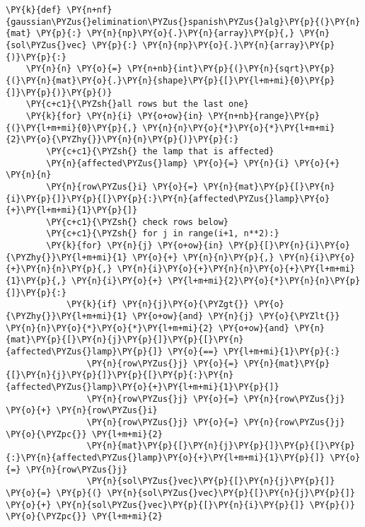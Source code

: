 \begin{english}
    \begin{tcolorbox}[breakable, size=fbox, boxrule=1pt, pad at break*=1mm,colback=cellbackground, colframe=cellborder]
\begin{Verbatim}[commandchars=\\\{\}]
\PY{k}{def} \PY{n+nf}{gaussian\PYZus{}elimination\PYZus{}spanish\PYZus{}alg}\PY{p}{(}\PY{n}{mat} \PY{p}{:} \PY{n}{np}\PY{o}{.}\PY{n}{array}\PY{p}{,} \PY{n}{sol\PYZus{}vec} \PY{p}{:} \PY{n}{np}\PY{o}{.}\PY{n}{array}\PY{p}{)}\PY{p}{:}
    \PY{n}{n} \PY{o}{=} \PY{n+nb}{int}\PY{p}{(}\PY{n}{sqrt}\PY{p}{(}\PY{n}{mat}\PY{o}{.}\PY{n}{shape}\PY{p}{[}\PY{l+m+mi}{0}\PY{p}{]}\PY{p}{)}\PY{p}{)}
    \PY{c+c1}{\PYZsh{}all rows but the last one}
    \PY{k}{for} \PY{n}{i} \PY{o+ow}{in} \PY{n+nb}{range}\PY{p}{(}\PY{l+m+mi}{0}\PY{p}{,} \PY{n}{n}\PY{o}{*}\PY{o}{*}\PY{l+m+mi}{2}\PY{o}{\PYZhy{}}\PY{n}{n}\PY{p}{)}\PY{p}{:}
        \PY{c+c1}{\PYZsh{} the lamp that is affected}
        \PY{n}{affected\PYZus{}lamp} \PY{o}{=} \PY{n}{i} \PY{o}{+} \PY{n}{n}
        \PY{n}{row\PYZus{}i} \PY{o}{=} \PY{n}{mat}\PY{p}{[}\PY{n}{i}\PY{p}{]}\PY{p}{[}\PY{p}{:}\PY{n}{affected\PYZus{}lamp}\PY{o}{+}\PY{l+m+mi}{1}\PY{p}{]}
        \PY{c+c1}{\PYZsh{} check rows below}
        \PY{c+c1}{\PYZsh{} for j in range(i+1, n**2):}
        \PY{k}{for} \PY{n}{j} \PY{o+ow}{in} \PY{p}{[}\PY{n}{i}\PY{o}{\PYZhy{}}\PY{l+m+mi}{1} \PY{o}{+} \PY{n}{n}\PY{p}{,} \PY{n}{i}\PY{o}{+}\PY{n}{n}\PY{p}{,} \PY{n}{i}\PY{o}{+}\PY{n}{n}\PY{o}{+}\PY{l+m+mi}{1}\PY{p}{,} \PY{n}{i}\PY{o}{+} \PY{l+m+mi}{2}\PY{o}{*}\PY{n}{n}\PY{p}{]}\PY{p}{:}
            \PY{k}{if} \PY{n}{j}\PY{o}{\PYZgt{}} \PY{o}{\PYZhy{}}\PY{l+m+mi}{1} \PY{o+ow}{and} \PY{n}{j} \PY{o}{\PYZlt{}} \PY{n}{n}\PY{o}{*}\PY{o}{*}\PY{l+m+mi}{2} \PY{o+ow}{and} \PY{n}{mat}\PY{p}{[}\PY{n}{j}\PY{p}{]}\PY{p}{[}\PY{n}{affected\PYZus{}lamp}\PY{p}{]} \PY{o}{==} \PY{l+m+mi}{1}\PY{p}{:}
                \PY{n}{row\PYZus{}j} \PY{o}{=} \PY{n}{mat}\PY{p}{[}\PY{n}{j}\PY{p}{]}\PY{p}{[}\PY{p}{:}\PY{n}{affected\PYZus{}lamp}\PY{o}{+}\PY{l+m+mi}{1}\PY{p}{]}
                \PY{n}{row\PYZus{}j} \PY{o}{=} \PY{n}{row\PYZus{}j} \PY{o}{+} \PY{n}{row\PYZus{}i}
                \PY{n}{row\PYZus{}j} \PY{o}{=} \PY{n}{row\PYZus{}j} \PY{o}{\PYZpc{}} \PY{l+m+mi}{2}
                \PY{n}{mat}\PY{p}{[}\PY{n}{j}\PY{p}{]}\PY{p}{[}\PY{p}{:}\PY{n}{affected\PYZus{}lamp}\PY{o}{+}\PY{l+m+mi}{1}\PY{p}{]} \PY{o}{=} \PY{n}{row\PYZus{}j}
                \PY{n}{sol\PYZus{}vec}\PY{p}{[}\PY{n}{j}\PY{p}{]} \PY{o}{=} \PY{p}{(} \PY{n}{sol\PYZus{}vec}\PY{p}{[}\PY{n}{j}\PY{p}{]} \PY{o}{+} \PY{n}{sol\PYZus{}vec}\PY{p}{[}\PY{n}{i}\PY{p}{]} \PY{p}{)} \PY{o}{\PYZpc{}} \PY{l+m+mi}{2}


\end{Verbatim}
\end{tcolorbox}
\end{english}
